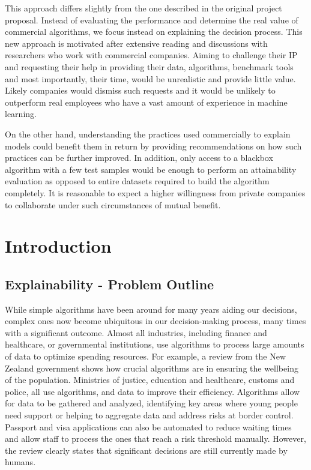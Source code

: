 \documentclass[proposal]{softeng}
\begin{document}
    This approach differs slightly from the one described in the original project proposal. Instead of evaluating the performance and determine the real value of commercial algorithms, we focus instead on explaining the decision process. This new approach is motivated after extensive reading and discussions with researchers who work with commercial companies. Aiming to challenge their IP and requesting their help in providing their data, algorithms, benchmark tools and most importantly, their time, would be unrealistic and provide little value. Likely companies would dismiss such requests and it would be unlikely to outperform real employees who have a vast amount of experience in machine learning.

    On the other hand, understanding the practices used commercially to explain models could benefit them in return by providing recommendations on how such practices can be further improved. In addition, only access to a blackbox algorithm with a few test samples would be enough to perform an attainability evaluation as opposed to entire datasets required to build the algorithm completely. It is reasonable to expect a higher willingness from private companies to collaborate under such circumstances of mutual benefit.


    \section{Introduction}

    \subsection{Explainability - Problem Outline}
    While simple algorithms have been around for many years aiding our decisions, complex ones now become ubiquitous in our decision-making process, many times with a significant outcome. Almost all industries, including finance and healthcare, or governmental institutions, use algorithms to process large amounts of data to optimize spending resources. For example, a review\cite{algassessment} from the New Zealand government shows how crucial algorithms are in ensuring the wellbeing of the population. Ministries of justice, education and healthcare, customs and police, all use algorithms, and data to improve their efficiency. Algorithms allow for data to be gathered and analyzed, identifying key areas where young people need support or helping to aggregate data and address risks at border control. Passport and visa applications can also be automated to reduce waiting times and allow staff to process the ones that reach a risk threshold manually. However, the review clearly states that significant decisions are still currently made by humans.
\end{document}
